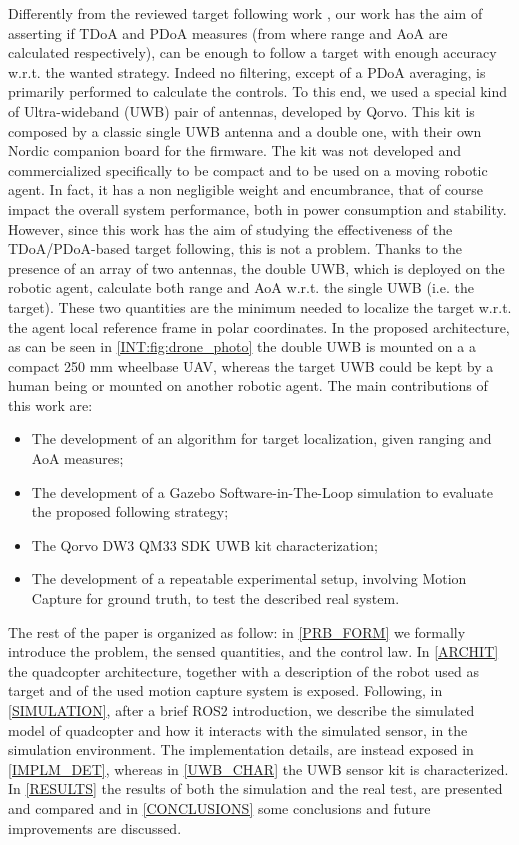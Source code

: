 Differently from the reviewed target following work \cite{Uwbbasedsol,sidebyside}, our work has the aim of asserting if TDoA and PDoA measures (from where range and AoA are calculated respectively), can be enough to follow a target with enough accuracy w.r.t. the wanted strategy. Indeed no filtering, except of a PDoA averaging, is primarily performed to calculate the controls. To this end, we used a special kind of Ultra-wideband (UWB) pair of antennas, developed by Qorvo. This kit is composed by a classic single UWB antenna and a double one, with their own Nordic companion board for the firmware. The kit was not developed and commercialized specifically to be compact and to be used on a moving robotic agent. In fact, it has a non negligible weight and encumbrance, that of course impact the overall system performance, both in power consumption and stability. However, since this work has the aim of studying the effectiveness of the TDoA/PDoA-based target following, this is not a problem. Thanks to the presence of an array of two antennas, the double UWB, which is deployed on the robotic agent, calculate both range and AoA w.r.t. the single UWB (i.e. the target). These two quantities are the minimum needed to localize the target w.r.t. the agent local reference frame in polar coordinates. In the proposed architecture, as can be seen in \autoref{INT:fig:drone_photo} the double UWB is mounted on a a compact 250 mm wheelbase UAV, whereas the target UWB could be kept by a human being or mounted on another robotic agent. The main contributions of this work are:
\begin{itemize}
    \item The development of an algorithm for target localization, given ranging and AoA measures;
    \item The development of a Gazebo Software-in-The-Loop simulation to evaluate the proposed following strategy;
    \item The Qorvo DW3 QM33 SDK UWB kit characterization;
    \item The development of a repeatable experimental setup, involving Motion Capture for ground truth, to test the described real system.
\end{itemize}
The rest of the paper is organized as follow: in \autoref{PRB_FORM} we formally introduce the problem, the sensed quantities, and the control law. In \autoref{ARCHIT} the quadcopter architecture, together with a description of the robot used as target and of the used motion capture system is exposed. Following, in \autoref{SIMULATION}, after a brief ROS2 introduction, we describe the simulated model of quadcopter and how it interacts with the simulated sensor, in the simulation environment. The implementation details, are instead exposed in \autoref{IMPLM_DET}, whereas in \autoref{UWB_CHAR} the UWB sensor kit is characterized. In \autoref{RESULTS} the results of both the simulation and the real test, are presented and compared and in \autoref{CONCLUSIONS} some conclusions and future improvements are discussed.

